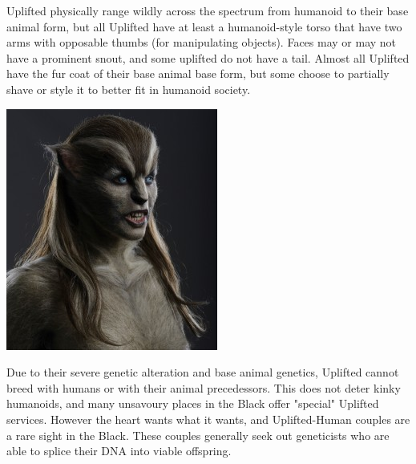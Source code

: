\documentclass[10pt,twoside]{article}
\begin{document}
\begin{multicols}{2}
  \columnbreak
  
  Uplifted physically range wildly across the spectrum from humanoid to their base animal form, but all Uplifted have at least a humanoid-style torso that have two arms with opposable thumbs (for manipulating objects). Faces may or may not have a prominent snout, and some uplifted do not have a tail. Almost all Uplifted have the fur coat of their base animal base form, but some choose to partially shave or style it to better fit in humanoid society.
  
  \includegraphics[width=\linewidth]{wolves-movie-still-1-263x300}
  
  Due to their severe genetic alteration and base animal genetics, Uplifted cannot breed with humans or with their animal precedessors. This does not deter kinky humanoids, and many unsavoury places in the Black offer "special" Uplifted services. However the heart wants what it wants, and Uplifted-Human couples are a rare sight in the Black. These couples generally seek out geneticists who are able to splice their DNA into viable offspring.
  

\end{multicols}
\end{document}
